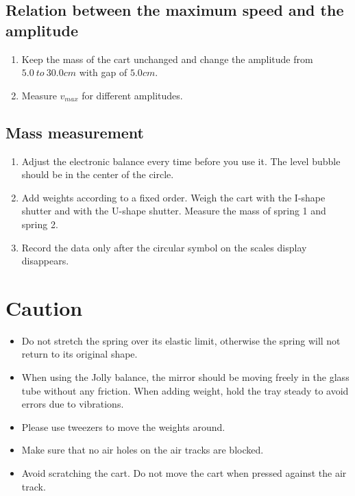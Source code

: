 \subsection{Relation between the maximum speed and the amplitude}

\begin{enumerate}
\item Keep the mass of the cart unchanged and change the amplitude from $5.0\
  to\ 30.0 cm$ with gap of $5.0cm$. 
\item Measure $v_{max}$ for different amplitudes.
\end{enumerate}

\subsection{Mass measurement}

\begin{enumerate}
\item Adjust the electronic balance every time before you use it. The level
  bubble should be in the center of the circle. 
\item Add weights according to a fixed order. Weigh the cart with the I-shape
  shutter and with the U-shape shutter. Measure the mass of spring 1 and spring
  2. 
\item Record the data only after the circular symbol on the scales display
  disappears. 
\end{enumerate}


\section{Caution}

\begin{itemize}
\item Do not stretch the spring over its elastic limit, otherwise the spring
  will not return to its original shape.  
\item When using the Jolly balance, the mirror should be moving freely in the
  glass tube without any friction. When adding weight, hold the tray steady to
  avoid errors due to vibrations. 
\item Please use tweezers to move the weights around.
\item  Make sure that no air holes on the air tracks are blocked.
\item Avoid scratching the cart. Do not move the cart when pressed against the
  air track.
\end{itemize}
